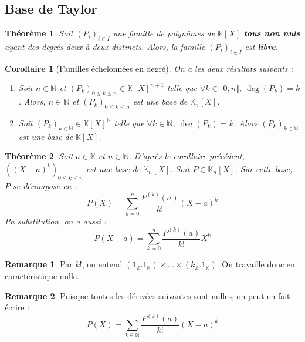 \documentclass[french]{book}
\newcommand{\N}{\mathbb{N}}
\newcommand{\Z}{\mathbb{Z}}
\newcommand{\K}{\mathbb{K}}
\theoremstyle{plain}
\newtheorem{thm}{Théorème}[chapter]
\newtheorem{cor}{Corollaire}[chapter]
\theoremstyle{definition}
\newtheorem{rmq}{Remarque}[chapter]
\theoremstyle{remark}
\begin{document}
\subsection{Base de Taylor}
\begin{thm}
	Soit $(P_i)_{i\in I}$ une famille de polynômes de $\K[X]$ \textbf{tous non nuls} ayant des degrés deux à deux distincts. Alors, la famille $(P_i)_{i\in I}$ est \textbf{libre}.
\end{thm}
\begin{cor}[Familles échelonnées en degré]
	On a les deux résultats suivants :
	\begin{enumerate}
		\item Soit $n\in\N$ et $(P_k)_{0\leqslant k\leqslant n}\in\K[X]^{n+1}$ telle que $\forall k \in\llbracket0,n\rrbracket, \ \deg(P_k)=k$. Alors, $n\in\N$ et $(P_k)_{0\leqslant k\leqslant n}$ est une base de $\K_n[X]$.
		\item Soit $(P_k)_{k\in\N}\in\K[X]^\N$ telle que $\forall k\in\N,\ \deg(P_k)=k$. Alors $(P_k)_{k\in\N}$ est une base de $\K[X]$.
	\end{enumerate}
\end{cor}
\begin{thm}
	Soit $a\in\K$ et $n\in\N$. D'après le corollaire précédent, $((X-a)^k)_{0\leqslant k\leqslant n}$ est une base de $\K_n[X]$. Soit $P\in\K_n[X]$. Sur cette base, $P$ se décompose en : $$P(X)=\sum_{k=0}^{n}\frac{P^{(k)}(a)}{k!}(X-a)^k$$ Pa substitution, on a aussi : $$P(X+a)=\sum_{k=0}^{n}\frac{P^{(k)}(a)}{k!}X^k$$
\end{thm}
\begin{rmq}
	Par $k!$, on entend $(1_\Z.1_\K)\times\ldots\times(k_\Z.1_\K)$. On travaille donc en caractéristique nulle.
\end{rmq}
\begin{rmq}
	Puisque toutes les dérivées suivantes sont nulles, on peut en fait écrire :$$P(X)=\sum_{k\in\N}\frac{P^{(k)}(a)}{k!}(X-a)^k$$
\end{rmq}
\end{document}
